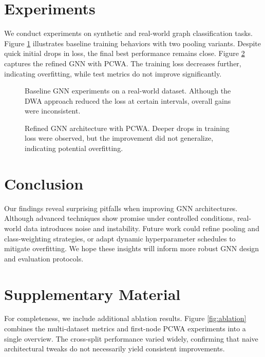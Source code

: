 \documentclass{article}
\begin{document}
\section{Experiments}
We conduct experiments on synthetic and real-world graph classification tasks. Figure \ref{fig:baseline} illustrates baseline training behaviors with two pooling variants. Despite quick initial drops in loss, the final best performance remains close. Figure \ref{fig:research} captures the refined GNN with PCWA. The training loss decreases further, indicating overfitting, while test metrics do not improve significantly.

\begin{figure}[ht]
\centering
{}
\hfill
{}
\caption{Baseline GNN experiments on a real-world dataset. Although the DWA approach reduced the loss at certain intervals, overall gains were inconsistent.}
\label{fig:baseline}
\end{figure}

\begin{figure}[ht]
\centering
{}
\hfill
{}
\caption{Refined GNN architecture with PCWA. Deeper drops in training loss were observed, but the improvement did not generalize, indicating potential overfitting.}
\label{fig:research}
\end{figure}

\section{Conclusion}
Our findings reveal surprising pitfalls when improving GNN architectures. Although advanced techniques show promise under controlled conditions, real-world data introduces noise and instability. Future work could refine pooling and class-weighting strategies, or adapt dynamic hyperparameter schedules to mitigate overfitting. We hope these insights will inform more robust GNN design and evaluation protocols.




\clearpage
\appendix
\section{Supplementary Material}
For completeness, we include additional ablation results. Figure \ref{fig:ablation} combines the multi-dataset metrics and first-node PCWA experiments into a single overview. The cross-split performance varied widely, confirming that naive architectural tweaks do not necessarily yield consistent improvements.
\end{document}
